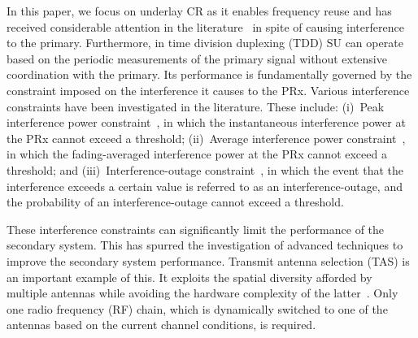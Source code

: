 \documentclass[12pt,draftcls,peerreview,onecolumn]{IEEEtran}
\begin{document}
In this paper, we focus on underlay CR as it enables frequency reuse and has received considerable attention in the literature~\cite{Hanif_2017_tcom} in spite of causing interference to the primary. Furthermore, in time division duplexing (TDD) SU can operate based on the periodic measurements of the primary signal without extensive coordination with the primary. 
Its performance is fundamentally governed by the constraint imposed on the interference it causes to the PRx. Various interference constraints have been investigated in the literature. These include: (i)~Peak interference power constraint~\cite{ Hanif_2015_globecom,Wang_2010_TWC, RZhang_2009_TWC}, in which  the instantaneous interference power at the PRx cannot exceed  a threshold; (ii)~Average interference power  constraint~\cite{ Sarvendranath_2013_TCOM,Wang_2011_TCom, Kashyap_2014_TCOM,Sarvendranath_2014_TCOM }, in which  the fading-averaged interference power at the PRx  cannot exceed  a threshold;  and (iii)~Interference-outage constraint~\cite{Kashyap_2014_TCOM,Sboui_2013_TWC,Rezki_2012_ieeeVt}, in which the event that the interference exceeds a certain value is referred to as an interference-outage, and the probability of an interference-outage cannot exceed a threshold.  

These interference constraints can significantly limit the performance of the secondary system. This has spurred the investigation of advanced techniques to improve the secondary system performance. Transmit antenna selection (TAS) is an important example of this. It exploits the spatial diversity afforded by multiple antennas while avoiding the hardware complexity of the latter~\cite{mehta_2012_ComMag}. Only one radio frequency (RF) chain, which is dynamically switched to one of the antennas based on the current channel conditions, is required. 
\end{document}
